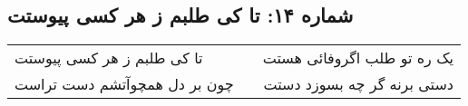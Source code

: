\begin{center}
\section*{شماره ۱۴: تا کی طلبم ز هر کسی پیوستت}
\label{sec:014}
\begin{longtable}{l p{0.5cm} r}
تا کی طلبم ز هر کسی پیوستت
&&
یک ره تو طلب اگروفائی هستت
\\
چون بر دل همچوآتشم دست تراست
&&
دستی برنه گر چه بسوزد دستت
\\
\end{longtable}
\end{center}
